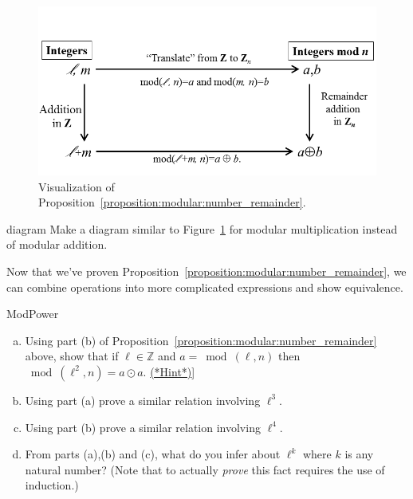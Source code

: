 \begin{figure}[h]
\begin{center}
\includegraphics[width=4.5in]{images/CommDiagModAdd.png}
\end{center}
\caption{Visualization of Proposition~\ref{proposition:modular:number_remainder}.\label{fig:commDiagModular}}
\end{figure}

\begin{exercise}{diagram}
Make a diagram similar to Figure~\ref{fig:commDiagModular} for modular multiplication instead of modular addition.
\end{exercise}

Now that we've proven Proposition~\ref{proposition:modular:number_remainder}, we can combine operations into more complicated expressions and show equivalence.

\begin{exercise}{ModPower}
\begin{enumerate}[(a)]
\item
Using part (b) of Proposition~\ref{proposition:modular:number_remainder} above, 
show that if $\ell \in {\mathbb Z}$ and $a=\bmod(\ell,n)$ then $\bmod(\ell^2,n) = a \odot a $. \hyperref[sec:modular_arithmetic:hints]{(*Hint*)}]
\item 
Using part (a) prove a similar relation involving $\ell^3$.
\item 
Using part (b) prove a similar relation involving $\ell^4$.
\item
From parts (a),(b) and (c), what do you infer about $\ell^k$ where $k$ is any natural number? (Note that to actually \emph{prove} this fact requires the use of induction.)
\end{enumerate}
\end{exercise}


